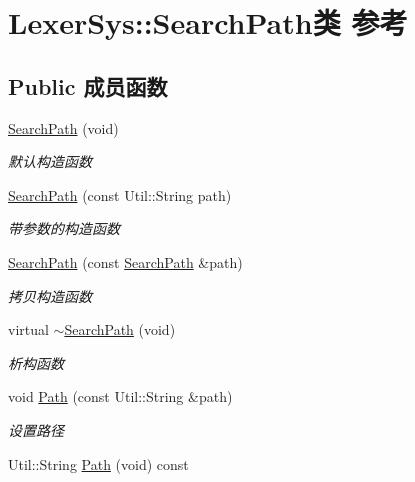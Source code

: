 \hypertarget{class_lexer_sys_1_1_search_path}{\section{Lexer\-Sys\-:\-:Search\-Path类 参考}
\label{class_lexer_sys_1_1_search_path}
}
\subsection*{Public 成员函数}
\begin{DoxyCompactItemize}
\item 
\hypertarget{class_lexer_sys_1_1_search_path_acb5047afe4efb653d8677f1646fa1c2b}{\hyperlink{class_lexer_sys_1_1_search_path_acb5047afe4efb653d8677f1646fa1c2b}{Search\-Path} (void)}\label{class_lexer_sys_1_1_search_path_acb5047afe4efb653d8677f1646fa1c2b}

\begin{DoxyCompactList}\small\item\em 默认构造函数 \end{DoxyCompactList}\item 
\hyperlink{class_lexer_sys_1_1_search_path_aba07d38fd89152b454fac47c5a6f000e}{Search\-Path} (const Util\-::\-String path)
\begin{DoxyCompactList}\small\item\em 带参数的构造函数 \end{DoxyCompactList}\item 
\hypertarget{class_lexer_sys_1_1_search_path_a8b67d627c73c4a278c82705cbadf5b8a}{\hyperlink{class_lexer_sys_1_1_search_path_a8b67d627c73c4a278c82705cbadf5b8a}{Search\-Path} (const \hyperlink{class_lexer_sys_1_1_search_path}{Search\-Path} \&path)}\label{class_lexer_sys_1_1_search_path_a8b67d627c73c4a278c82705cbadf5b8a}

\begin{DoxyCompactList}\small\item\em 拷贝构造函数 \end{DoxyCompactList}\item 
\hypertarget{class_lexer_sys_1_1_search_path_ac012486c06a45cf608f7fb101fb79520}{virtual \hyperlink{class_lexer_sys_1_1_search_path_ac012486c06a45cf608f7fb101fb79520}{$\sim$\-Search\-Path} (void)}\label{class_lexer_sys_1_1_search_path_ac012486c06a45cf608f7fb101fb79520}

\begin{DoxyCompactList}\small\item\em 析构函数 \end{DoxyCompactList}\item 
void \hyperlink{class_lexer_sys_1_1_search_path_a28ea29a96f8ef4c94f98d39c756b82f9}{Path} (const Util\-::\-String \&path)
\begin{DoxyCompactList}\small\item\em 设置路径 \end{DoxyCompactList}\item 
\hypertarget{class_lexer_sys_1_1_search_path_a0383fa9524f999a5905b1bac0beb1086}{Util\-::\-String \hyperlink{class_lexer_sys_1_1_search_path_a0383fa9524f999a5905b1bac0beb1086}{Path} (void) const }\label{class_lexer_sys_1_1_search_path_a0383fa9524f999a5905b1bac0beb1086}


\end{DoxyCompactItemize}
